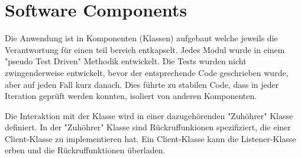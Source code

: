 \section{Software Components}

Die Anwendung ist in Komponenten (Klassen) aufgebaut welche jeweils die Verantwortung für einen teil bereich entkapselt. Jedes Modul wurde in einem "pseudo Test Driven" Methodik entwickelt. Die Tests wurden nicht zwingenderweise entwickelt, bevor der entsprechende Code geschrieben wurde, aber auf jeden Fall kurz danach. Dies führte zu stabilen Code, dass in jeder Iteration geprüft werden konnten, isoliert von anderen Komponenten.

Die Interaktion mit der Klasse wird in einer dazugehörenden "Zuhöhrer" Klasse definiert. In der "Zuhöhrer" Klasse sind Rückruffunkionen spezifiziert, die einer Client-Klasse zu implementieren hat. Ein Client-Klasse kann die Listener-Klasse erben und die Rückruffunktionen überladen.